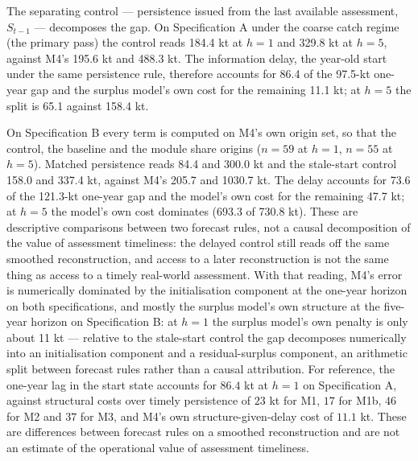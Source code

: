 \documentclass[11pt]{article}
\begin{document}
The separating control --- persistence issued from the last available
assessment, \(S_{t-1}\) --- decomposes the gap. On Specification A under
the coarse catch regime (the primary pass) the control reads 184.4 kt at
\(h = 1\) and 329.8 kt at \(h = 5\), against M4's 195.6 kt and 488.3 kt.
The information delay, the year-old start under the same persistence
rule, therefore accounts for 86.4 of the 97.5-kt one-year gap and the
surplus model's own cost for the remaining 11.1 kt; at \(h = 5\) the
split is 65.1 against 158.4 kt.

On Specification B every term is computed on M4's own origin set, so
that the control, the baseline and the module share origins (\(n=59\)
at \(h=1\), \(n=55\) at \(h=5\)). Matched persistence reads 84.4 and
300.0 kt and the stale-start control 158.0 and 337.4 kt, against M4's
205.7 and 1030.7 kt. The delay accounts for 73.6 of the 121.3-kt
one-year gap and the model's own cost for the remaining 47.7 kt; at
\(h = 5\) the model's own cost dominates (693.3 of 730.8 kt). These are descriptive comparisons between two
forecast rules, not a causal decomposition of the value of assessment
timeliness: the delayed control still reads off the same smoothed
reconstruction, and access to a later reconstruction is not the same
thing as access to a timely real-world assessment. With that reading,
M4's error is numerically dominated by the initialisation component at the
one-year horizon on both specifications, and mostly the surplus model's own structure at the
five-year horizon on Specification B: at \(h = 1\) the surplus model's
own penalty is only about 11 kt --- relative to the stale-start control the gap decomposes numerically into
an initialisation component and a residual-surplus component, an
arithmetic split between forecast rules rather than a causal
attribution. For reference, the one-year lag in the start state accounts for \(86.4\) kt
at \(h = 1\) on Specification A, against structural costs over timely
persistence of \(23\) kt for M1, \(17\) for M1b, \(46\) for M2 and
\(37\) for M3, and M4's own structure-given-delay cost of \(11.1\) kt.
These are differences between forecast rules on a smoothed
reconstruction and are not an estimate of the operational value of
assessment timeliness.
\end{document}
